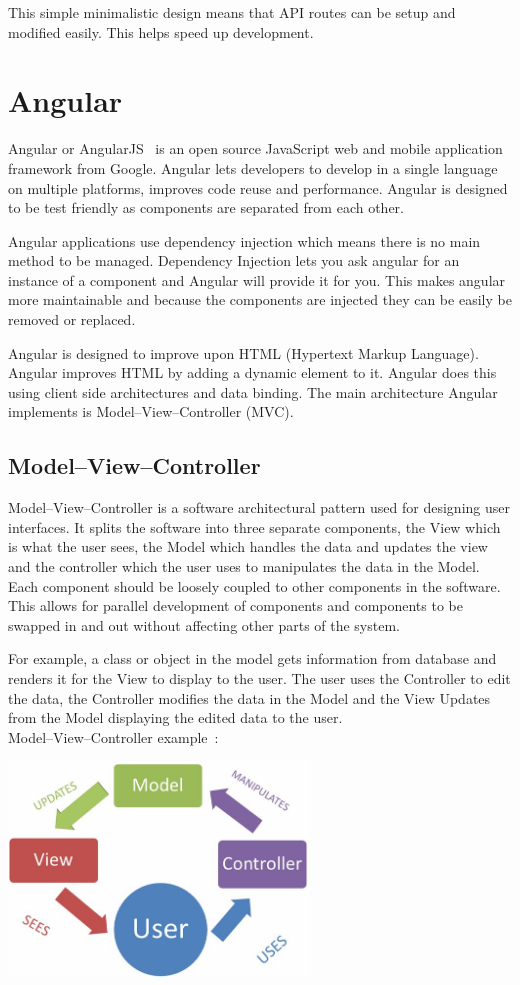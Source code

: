 This simple minimalistic design means that API routes can be setup and modified easily. This helps speed up development. 
\section{Angular}
Angular or AngularJS~\cite{Angular} is an open source JavaScript web and mobile application framework from Google. Angular lets developers to develop in a single language on multiple platforms, improves code reuse and performance. Angular is designed to be test friendly as components are separated from each other. 

Angular applications use dependency injection which means there is no main method to be managed. Dependency Injection lets you ask angular for an instance of a component and Angular will provide it for you. This makes angular more maintainable and because the components are injected they can be easily be removed or replaced.

Angular is designed to improve upon HTML (Hypertext Markup Language). Angular improves HTML by adding a dynamic element to it. Angular does this using client side architectures and data binding. The main architecture Angular implements is Model–View–Controller (MVC). 

\subsection{Model–View–Controller}
Model–View–Controller is a software architectural pattern used for designing user interfaces. It splits the software into three separate components, the View which is what the user sees, the Model which handles the data and updates the view and the controller which the user uses to manipulates the data in the Model. Each component should be loosely coupled to other components in the software. This allows for parallel development of components and components to be swapped in and out without affecting other parts of the system. 

For example, a class or object in the model gets information from database and renders it for the View to display to the user. The user uses the Controller to edit the data, the Controller modifies the data in the Model and the View Updates from the Model displaying the edited data to the user. \\

Model–View–Controller example~\cite{MVCphoto}:
\begin{center}    
    \includegraphics[width=80mm]{img/MVC.png}
\end{center}

